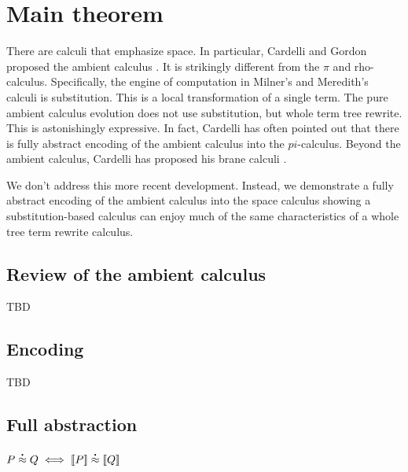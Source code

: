 \section{Main theorem}
There are calculi that emphasize space. In particular, Cardelli and
Gordon proposed the ambient calculus \cite{DBLP:journals/entcs/CardelliG97}. It is strikingly different from
the $\pi$ and rho-calculus. Specifically, the engine of computation in
Milner's and Meredith's calculi is substitution. This is a local
transformation of a single term. The pure ambient calculus evolution
does not use substitution, but whole term tree rewrite. This is
astonishingly expressive. In fact, Cardelli has often pointed out that
there is fully abstract encoding of the ambient calculus into the
$pi$-calculus. Beyond the ambient calculus, Cardelli has proposed his brane calculi \cite{DBLP:conf/cmsb/Cardelli04}.

We don't address this more recent development. Instead, we demonstrate
a fully abstract encoding of the ambient calculus into the space
calculus showing a substitution-based calculus can enjoy much of the same characteristics of a whole tree term rewrite calculus.

\subsection{Review of the ambient calculus}

TBD

\subsection{Encoding}

TBD

\subsection{Full abstraction}
\begin{theorem}
  $P \stackrel{\centerdot}{\approx} Q \iff [\![ P ]\!] \stackrel{\centerdot}{\approx} [\![ Q ]\!]$
\end{theorem}


